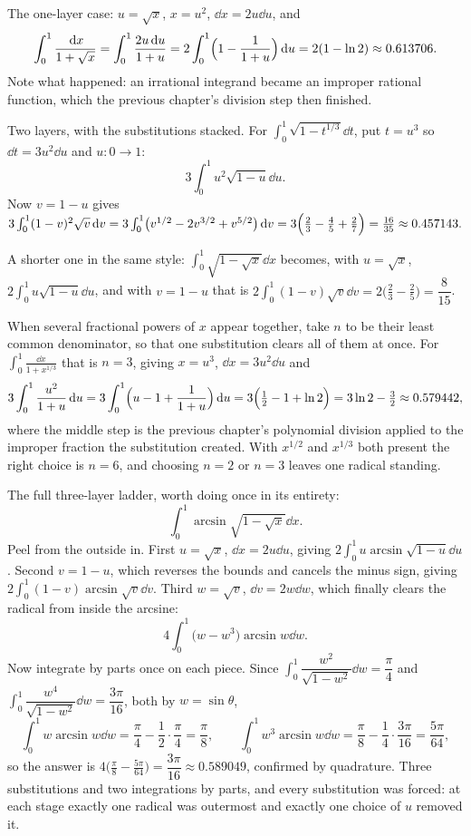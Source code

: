 \begin{worked}
The one-layer case: $u=\sqrt x$, $x=u^2$, $\dd x=2u\dd u$, and
\[
\int_0^1\frac{\,\mathrm{d} x}{1+\sqrt x}=\int_0^1\frac{2u\,\mathrm{d} u}{1+u}=2\int_0^1\Bigl(1-\frac{1}{1+u}\Bigr)\,\mathrm{d} u=2(1-\ln2)\approx0.613706 .
\]
Note what happened: an irrational integrand became an improper rational function, which the previous chapter's division step then finished.

Two layers, with the substitutions stacked. For $\displaystyle\int_0^1\sqrt{1-t^{1/3}}\dd t$, put $t=u^3$ so $\dd t=3u^2\dd u$ and $u:0\to1$:
\[
3\int_0^1u^2\sqrt{1-u}\dd u .
\]
Now $v=1-u$ gives $3\int_0^1(1-v)^2\sqrt v\,\mathrm{d} v=3\int_0^1\bigl(v^{1/2}-2v^{3/2}+v^{5/2}\bigr)\,\mathrm{d} v=3\Bigl(\tfrac23-\tfrac45+\tfrac27\Bigr)=\frac{16}{35}\approx0.457143 .$

A shorter one in the same style: $\displaystyle\int_0^1\sqrt{1-\sqrt x}\dd x$ becomes, with $u=\sqrt x$, $2\int_0^1u\sqrt{1-u}\dd u$, and with $v=1-u$ that is $2\int_0^1(1-v)\sqrt v\dd v=2\bigl(\tfrac23-\tfrac25\bigr)=\dfrac{8}{15}$.

When several fractional powers of $x$ appear together, take $n$ to be their least common denominator, so that one substitution clears all of them at once. For $\displaystyle\int_0^1\frac{\dd x}{1+x^{1/3}}$ that is $n=3$, giving $x=u^3$, $\dd x=3u^2\dd u$ and
\[
3\int_0^1\frac{u^2}{1+u}\,\mathrm{d} u=3\int_0^1\Bigl(u-1+\frac{1}{1+u}\Bigr)\,\mathrm{d} u=3\Bigl(\tfrac12-1+\ln2\Bigr)=3\ln2-\tfrac32\approx0.579442 ,
\]
where the middle step is the previous chapter's polynomial division applied to the improper fraction the substitution created. With $x^{1/2}$ and $x^{1/3}$ both present the right choice is $n=6$, and choosing $n=2$ or $n=3$ leaves one radical standing.

The full three-layer ladder, worth doing once in its entirety:
\[
\int_0^1\arcsin\sqrt{1-\sqrt x}\dd x .
\]
Peel from the outside in. First $u=\sqrt x$, $\dd x=2u\dd u$, giving $2\int_0^1u\arcsin\sqrt{1-u}\dd u$. Second $v=1-u$, which reverses the bounds and cancels the minus sign, giving $2\int_0^1(1-v)\arcsin\sqrt v\dd v$. Third $w=\sqrt v$, $\dd v=2w\dd w$, which finally clears the radical from inside the arcsine:
\[
4\int_0^1\bigl(w-w^3\bigr)\arcsin w\dd w .
\]
Now integrate by parts once on each piece. Since $\int_0^1\dfrac{w^2}{\sqrt{1-w^2}}\dd w=\dfrac{\pi}{4}$ and $\int_0^1\dfrac{w^4}{\sqrt{1-w^2}}\dd w=\dfrac{3\pi}{16}$, both by $w=\sin\theta$,
\[
\int_0^1w\arcsin w\dd w=\frac{\pi}{4}-\frac12\cdot\frac{\pi}{4}=\frac{\pi}{8},
\qquad
\int_0^1w^3\arcsin w\dd w=\frac{\pi}{8}-\frac14\cdot\frac{3\pi}{16}=\frac{5\pi}{64},
\]
so the answer is $4\bigl(\tfrac{\pi}{8}-\tfrac{5\pi}{64}\bigr)=\dfrac{3\pi}{16}\approx0.589049$, confirmed by quadrature. Three substitutions and two integrations by parts, and every substitution was forced: at each stage exactly one radical was outermost and exactly one choice of $u$ removed it.
\end{worked}

